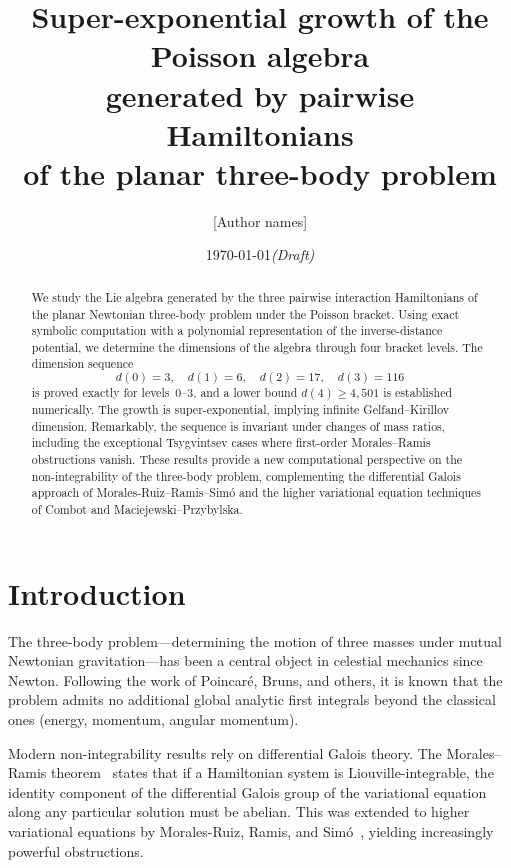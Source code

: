 \documentclass[11pt,a4paper]{article}
\title{Super-exponential growth of the Poisson algebra\\
generated by pairwise Hamiltonians\\
of the planar three-body problem}
\author{[Author names]}
\date{\today \quad \textit{(Draft)}}
\theoremstyle{remark}
\begin{document}
\maketitle

\begin{abstract}
We study the Lie algebra generated by the three pairwise
interaction Hamiltonians of the planar Newtonian three-body
problem under the Poisson bracket.  Using exact symbolic
computation with a polynomial representation of the
inverse-distance potential, we determine the dimensions of the
algebra through four bracket levels.  The dimension sequence
\[
  d(0)=3,\quad d(1)=6,\quad d(2)=17,\quad d(3)=116
\]
is proved exactly for levels~0--3, and a lower bound
$d(4) \ge 4{,}501$ is established numerically.
The growth is super-exponential, implying
infinite Gelfand--Kirillov dimension.  Remarkably, the sequence
is invariant under changes of mass ratios, including the
exceptional Tsygvintsev cases where first-order Morales--Ramis
obstructions vanish.  These results provide a new computational
perspective on the non-integrability of the three-body problem,
complementing the differential Galois approach of
Morales-Ruiz--Ramis--Sim\'{o} and the higher variational equation
techniques of Combot and Maciejewski--Przybylska.
\end{abstract}


\section{Introduction}

The three-body problem---determining the motion of three masses
under mutual Newtonian gravitation---has been a central object in
celestial mechanics since Newton.  Following the work of
Poincar\'{e}, Bruns, and others, it is known that the problem
admits no additional global analytic first integrals beyond the
classical ones (energy, momentum, angular momentum).

Modern non-integrability results rely on differential Galois
theory.  The Morales--Ramis theorem~\cite{morales-ramis-2001}
states that if a Hamiltonian system is Liouville-integrable, the
identity component of the differential Galois group of the
variational equation along any particular solution must be
abelian.  This was extended to higher variational equations by
Morales-Ruiz, Ramis, and Sim\'{o}~\cite{morales-ramis-simo-2007},
yielding increasingly powerful obstructions.
\end{document}
